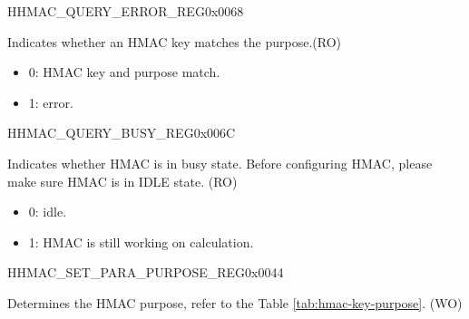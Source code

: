 \begin{register}{H}{HMAC\_QUERY\_ERROR\_REG}{0x0068}\label{regdesc:HMACQUERYERRORREG}
%
%
\regnewline%
\begin{regdesc}\begin{reglist}
\label{fielddesc:HMACQUREYCHECK}\item [HMAC\_QUREY\_CHECK] Indicates whether an HMAC key matches the purpose.(RO)
\begin{itemize}
    \item 0: HMAC key and purpose match.
    \item 1: error.
\end{itemize}
\end{reglist}\end{regdesc}
\end{register}


\begin{register}{H}{HMAC\_QUERY\_BUSY\_REG}{0x006C}\label{regdesc:HMACQUERYBUSYREG}
%
%
\regnewline%
\begin{regdesc}\begin{reglist}
\label{fielddesc:HMACBUSYSTATE}\item [HMAC\_BUSY\_STATE] Indicates whether HMAC is in busy state. Before configuring HMAC, please make sure HMAC is in IDLE state. (RO)
\begin{itemize}
    \item 0: idle.
    \item 1: HMAC is still working on calculation.
\end{itemize}
\end{reglist}\end{regdesc}
\end{register}


\begin{register}{H}{HMAC\_SET\_PARA\_PURPOSE\_REG}{0x0044}\label{regdesc:HMACSETPARAPURPOSEREG}
%
%
\regnewline%
\begin{regdesc}\begin{reglist}
\label{fielddesc:HMACPURPOSESET}\item [HMAC\_PURPOSE\_SET] Determines the HMAC purpose, refer to the Table \ref{tab:hmac-key-purpose}. (WO)
\end{reglist}\end{regdesc}
\end{register}


